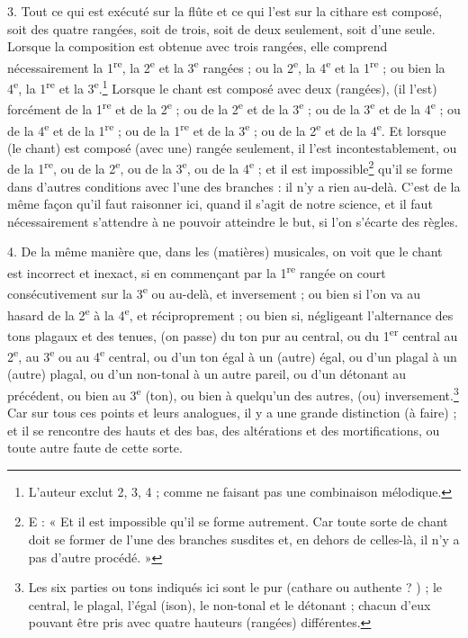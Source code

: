 \documentclass[a4paper, 11pt, oneside, polutonikogreek, french]{article}
\begin{document}
3. Tout ce qui est exécuté sur la flûte et ce qui l'est sur la cithare est composé, soit des quatre rangées, soit de trois, soit de deux seulement, soit d'une seule. Lorsque la composition est obtenue avec trois rangées, elle comprend nécessairement la 1\textsuperscript{re}, la 2\textsuperscript{e} et la 3\textsuperscript{e} rangées ; ou la 2\textsuperscript{e}, la 4\textsuperscript{e} et la 1\textsuperscript{re} ; ou bien la 4\textsuperscript{e}, la 1\textsuperscript{re} et la 3\textsuperscript{e}.\footnote{L'auteur exclut 2, 3, 4 ; comme ne faisant pas une combinaison mélodique.} Lorsque le chant est composé avec deux (rangées), (il l'est) forcément de la 1\textsuperscript{re} et de la 2\textsuperscript{e} ; ou de la 2\textsuperscript{e} et de la 3\textsuperscript{e} ; ou de la 3\textsuperscript{e} et de la 4\textsuperscript{e} ; ou de la 4\textsuperscript{e} et de la 1\textsuperscript{re} ; ou de la 1\textsuperscript{re} et de la 3\textsuperscript{e} ; ou de la 2\textsuperscript{e} et de la 4\textsuperscript{e}. Et lorsque (le chant) est composé (avec une) rangée seulement, il l'est incontestablement, ou de la 1\textsuperscript{re}, ou de la 2\textsuperscript{e}, ou de la 3\textsuperscript{e}, ou de la 4\textsuperscript{e} ; et il est impossible\footnote{E : « Et il est impossible qu'il se forme autrement. Car toute sorte de chant doit se former de l'une des branches susdites et, en dehors de celles-là, il n'y a pas d'autre procédé. »} qu'il se forme dans d'autres conditions avec l'une des branches : il n'y a rien au-delà. C'est de la même façon qu'il faut raisonner ici, quand il s'agit de notre science, et il faut nécessairement s'attendre à ne pouvoir atteindre le but, si l'on s'écarte des règles.

4. De la même manière que, dans les (matières) musicales, on voit que le chant est incorrect et inexact, si en commençant par la 1\textsuperscript{re} rangée on court consécutivement sur la 3\textsuperscript{e} ou au-delà, et inversement ; ou bien si l'on va au hasard de la 2\textsuperscript{e} à la 4\textsuperscript{e}, et réciproprement ; ou bien si, négligeant l'alternance des tons plagaux et des tenues, (on passe) du ton pur au central, ou du 1\textsuperscript{er} central au 2\textsuperscript{e}, au 3\textsuperscript{e} ou au 4\textsuperscript{e} central, ou d'un ton égal à un (autre) égal, ou d'un plagal à un (autre) plagal, ou d'un non-tonal à un autre pareil, ou d'un détonant au précédent, ou bien au 3\textsuperscript{e} (ton), ou bien à quelqu'un des autres, (ou) inversement.\footnote{Les six parties ou tons indiqués ici sont le pur (cathare ou authente ? ) ; le central, le plagal, l'égal (ison), le non-tonal et le détonant ; chacun d'eux pouvant être pris avec quatre hauteurs (rangées) différentes.} Car sur tous ces points et leurs analogues, il y a une grande distinction (à faire) ; et il se rencontre des hauts et des bas, des altérations et des mortifications, ou toute autre faute de cette sorte.
\end{document}

